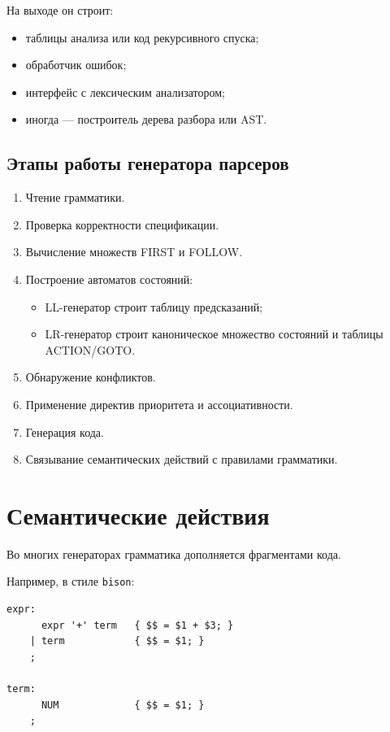 \documentclass[12pt,a4paper]{article}
\begin{document}
На выходе он строит:
\begin{itemize}
    \item таблицы анализа или код рекурсивного спуска;
    \item обработчик ошибок;
    \item интерфейс с лексическим анализатором;
    \item иногда --- построитель дерева разбора или AST.
\end{itemize}

\subsection{Этапы работы генератора парсеров}

\begin{enumerate}
    \item Чтение грамматики.
    \item Проверка корректности спецификации.
    \item Вычисление множеств FIRST и FOLLOW.
    \item Построение автоматов состояний:
    \begin{itemize}
        \item LL-генератор строит таблицу предсказаний;
        \item LR-генератор строит каноническое множество состояний и таблицы ACTION/GOTO.
    \end{itemize}
    \item Обнаружение конфликтов.
    \item Применение директив приоритета и ассоциативности.
    \item Генерация кода.
    \item Связывание семантических действий с правилами грамматики.
\end{enumerate}

\section{Семантические действия}

Во многих генераторах грамматика дополняется фрагментами кода.

Например, в стиле \texttt{bison}:

\begin{lstlisting}
expr:
      expr '+' term   { $$ = $1 + $3; }
    | term            { $$ = $1; }
    ;

term:
      NUM             { $$ = $1; }
    ;
\end{lstlisting}
\end{document}
